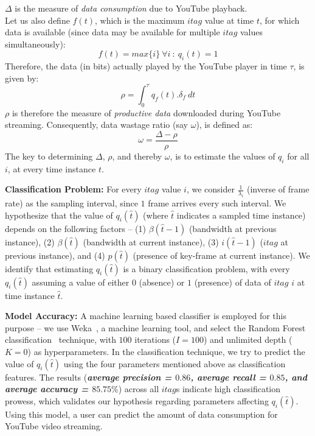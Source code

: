 $\Delta$ is the measure of {\it data consumption} due to YouTube playback.\\
Let us also define $f(t)$, which is the maximum $itag$ value at time $t$, for which data is available (since data may be available for multiple $itag$ values simultaneously):
\begin{equation}
 f(t) = max\{i\}\ \forall i\ :\ q_{i}(t) = 1
\end{equation}
Therefore, the data (in bits) actually played by the YouTube player in time $\tau$, is given by:
\begin{equation}
 \rho = \int_{0}^{\tau} q_{f}(t).\delta_{f}\ dt
\end{equation}
$\rho$ is therefore the measure of {\it productive data} downloaded during YouTube streaming.
Consequently, data wastage ratio (say $\omega$), is defined as:
\begin{equation}
 \omega = \frac{\Delta - \rho}{\rho}
\end{equation}
The key to determining $\Delta$, $\rho$, and thereby $\omega$, is to estimate the values of $q_{i}$ for all $i$, at every time instance $t$.

{\bf Classification Problem:} For every $itag$ value $i$, we consider $\frac{1}{\lambda_i}$ (inverse of frame rate) as the sampling interval, since $1$ frame arrives every such interval.
We hypothesize that the value of $q_i(\hat{t})$ (where $\hat{t}$ indicates a sampled time instance) depends on the following factors -- (1) $\beta(\hat{t}-1)$ (bandwidth at previous instance), (2) $\beta(\hat{t})$ (bandwidth at current instance), (3) $i(\hat{t}-1)$ ($itag$ at previous instance), and (4) $p(\hat{t})$ (presence of key-frame at current instance).
We identify that estimating $q_i(\hat{t})$ is a binary classification problem, with every $q_i(\hat{t})$ assuming a value of either $0$ (absence) or $1$ (presence) of data of $itag$ $i$ at time instance $\hat{t}$.

\textbf{Model Accuracy:} A machine learning based classifier is employed for this purpose -- we use Weka~\cite{witten2016data}, a machine learning tool, and select the Random Forest classification~\cite{breiman2001random} technique, with $100$ iterations ($I=100$) and unlimited depth ($K=0$) as hyperparameters.
In the classification technique, we try to predict the value of $q_i(\hat{t})$ using the four parameters mentioned above as classification features.
The results (\emph{\textbf{average precision = $0.86$, average recall = $0.85$, and average accuracy = $85.75\%$}}) across all $itag$s indicate high classification prowess, which validates our hypothesis regarding parameters affecting $q_i(\hat{t})$.
Using this model, a user can predict the amount of data consumption for YouTube video streaming.
